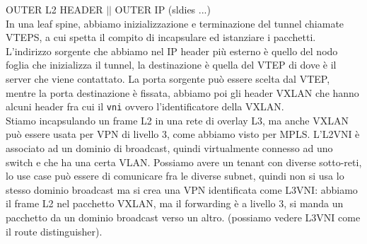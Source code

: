 \documentclass[12pt, oneside]{extbook} %
\begin{document}
OUTER L2 HEADER $||$ OUTER IP (sldies ...)\\In una leaf spine, abbiamo inizializzazione e terminazione del tunnel chiamate VTEPS, a cui spetta il compito di incapsulare ed istanziare i pacchetti. L'indirizzo sorgente che abbiamo nel IP header più esterno è quello del nodo foglia che inizializza il tunnel, la destinazione è quella del VTEP di dove è il server che viene contattato. La porta sorgente può essere scelta dal VTEP, mentre la porta destinazione è fissata, abbiamo poi gli header VXLAN che hanno alcuni header fra cui il \texttt{vni} ovvero l'identificatore della VXLAN.\\Stiamo incapsulando un frame L2 in una rete di overlay L3, ma anche VXLAN può essere usata per VPN di livello 3, come abbiamo visto per MPLS. L'L2VNI è associato ad un dominio di broadcast, quindi virtualmente connesso ad uno switch e che ha una certa VLAN. Possiamo avere un tenant con diverse sotto-reti, lo use case può essere di comunicare fra le diverse subnet, quindi non si usa lo stesso dominio broadcast ma si crea una VPN identificata come L3VNI: abbiamo il frame L2 nel pacchetto VXLAN, ma il forwarding è a livello 3, si manda un pacchetto da un dominio broadcast verso un altro. (possiamo vedere L3VNI come il route distinguisher).
\end{document}
